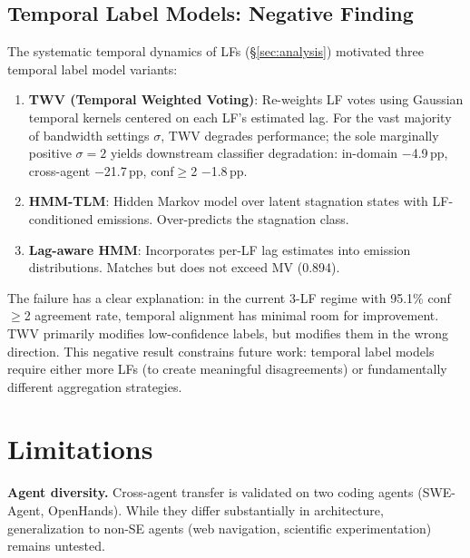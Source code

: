 \documentclass[11pt,a4paper]{article}
\begin{document}
\subsection{Temporal Label Models: Negative Finding}
\label{sec:tlm}

The systematic temporal dynamics of LFs (\S\ref{sec:analysis}) motivated three temporal label model variants:

\begin{enumerate}[leftmargin=*,itemsep=1pt]
\item \textbf{TWV (Temporal Weighted Voting)}: Re-weights LF votes using Gaussian temporal kernels centered on each LF's estimated lag. For the vast majority of bandwidth settings $\sigma$, TWV degrades performance; the sole marginally positive $\sigma{=}2$ yields downstream classifier degradation: in-domain $-$4.9\,pp, cross-agent $-$21.7\,pp, conf$\geq$2 $-$1.8\,pp.

\item \textbf{HMM-TLM}: Hidden Markov model over latent stagnation states with LF-conditioned emissions. Over-predicts the stagnation class.

\item \textbf{Lag-aware HMM}: Incorporates per-LF lag estimates into emission distributions. Matches but does not exceed MV (0.894).
\end{enumerate}

The failure has a clear explanation: in the current 3-LF regime with 95.1\% conf$\geq$2 agreement rate, temporal alignment has minimal room for improvement.
TWV primarily modifies low-confidence labels, but modifies them in the wrong direction.
This negative result constrains future work: temporal label models require either more LFs (to create meaningful disagreements) or fundamentally different aggregation strategies.

\section{Limitations}

\textbf{Agent diversity.}
Cross-agent transfer is validated on two coding agents (SWE-Agent, OpenHands).
While they differ substantially in architecture, generalization to non-SE agents (web navigation, scientific experimentation) remains untested.
\end{document}
